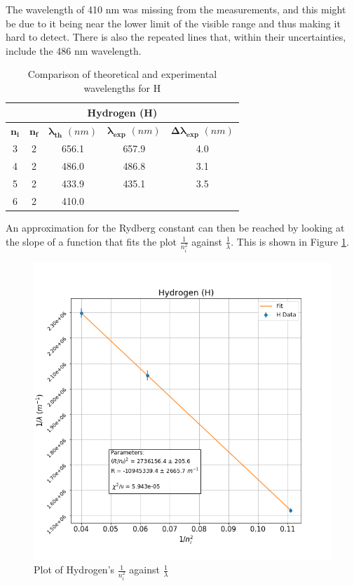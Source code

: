\documentclass[a4paper, twocolumn]{article}
\begin{document}
The wavelength of 410 nm was missing from the measurements, and this might be due to it being near the lower limit of the visible range and thus making it
hard to detect. There is also the repeated lines that, within their uncertainties, include the 486 nm wavelength.
\begin{table}[h!]
\centering
\begin{tabular}{ |c|c|c|c|c| }
 \hline
 \multicolumn{5}{|c|}{\textbf{Hydrogen (H)}} \\
 \hline
 $\boldsymbol{n_i}$ & $\boldsymbol{n_f}$ & $\boldsymbol{\lambda_{th}}$  $(nm)$ & $\boldsymbol{\lambda_{exp}}$  $(nm)$ & $\boldsymbol{\Delta\lambda_{exp}}$ $(nm)$ \\
 \hline
 3 & 2 & 656.1 & 657.9 & 4.0 \\
 \hline
 4 & 2 & 486.0 & 486.8 & 3.1 \\
 \hline
 5 & 2 & 433.9 & 435.1 & 3.5 \\ 
 \hline
 6 & 2 & 410.0 & & \\
 \hline
\end{tabular}
\caption{Comparison of theoretical and experimental wavelengths for H}
\label{table:comparisonH}
\end{table}

An approximation for the Rydberg constant can then be reached by looking at the slope of a function that fits the plot $\frac{1}{n_i^2}$ against $\frac{1}{\lambda}$.
This is shown in Figure \ref{fig:hydrogen}.
\begin{figure}[h!]
 \centering
 \includegraphics[scale = 0.4]{hydrogen}
 \caption{Plot of Hydrogen's $\frac{1}{n^2_i}$ against $\frac{1}{\lambda}$}
 \label{fig:hydrogen}
\end{figure}
\end{document}

